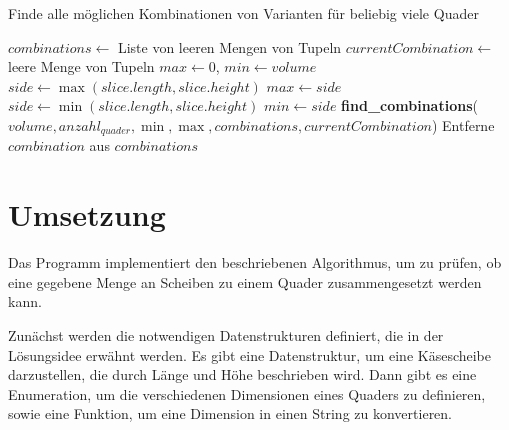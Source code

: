 \documentclass[a4paper,10pt,ngerman]{scrartcl}
\begin{document}
    \begin{algorithm}[H]
        \caption{Finde alle möglichen Kombinationen von Varianten für beliebig viele Quader}
        \label{alg:p}
        \begin{algorithmic}[1]
                \State $combinations \gets$ Liste von leeren Mengen von Tupeln
                \State $currentCombination \gets$ leere Menge von Tupeln
                \State $max \gets 0$, $min \gets volume$
                    \State $side \gets \max(slice.length, slice.height)$
                        \State $max \gets side$
                    \EndIf
                    \State $side \gets \min(slice.length, slice.height)$
                        \State $min \gets side$
                    \EndIf
                \EndFor
                \State \textbf{find\_combinations}($volume, anzahl_{quader}, \min, \max, combinations, currentCombination$)
                        \State Entferne $combination$ aus $combinations$
                    \EndIf
                \EndFor
                \State {}\label{alg:algorithm}
            \EndFunction
        \end{algorithmic}
    \end{algorithm}

    \newpage


    \section{Umsetzung}\label{sec:umsetzung}

    Das Programm implementiert den beschriebenen Algorithmus, um zu prüfen, ob eine gegebene Menge an Scheiben zu einem Quader zusammengesetzt werden kann.

    Zunächst werden die notwendigen Datenstrukturen definiert, die in der Lösungsidee erwähnt werden.
    Es gibt eine Datenstruktur, um eine Käsescheibe darzustellen, die durch Länge und Höhe beschrieben wird.
    Dann gibt es eine Enumeration, um die verschiedenen Dimensionen eines Quaders zu definieren, sowie eine Funktion, um eine Dimension in einen String zu konvertieren.
\end{document}
